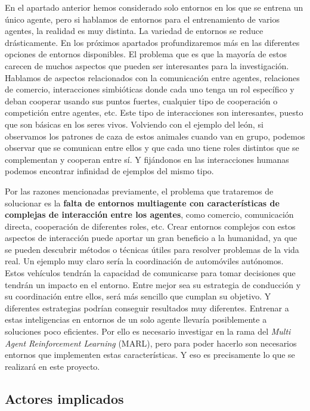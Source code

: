 En el apartado anterior hemos considerado solo entornos en los que se entrena un único agente, pero si hablamos de entornos para el entrenamiento de varios agentes, la realidad es muy distinta. La variedad de entornos se reduce drásticamente. En los próximos apartados profundizaremos más en las diferentes opciones de entornos disponibles. El problema que es que la mayoría de estos carecen de muchos aspectos que pueden ser interesantes para la investigación. Hablamos de aspectos relacionados con la comunicación entre agentes, relaciones de comercio, interacciones simbióticas donde cada uno tenga un rol específico y deban cooperar usando sus puntos fuertes, cualquier tipo de cooperación o competición entre agentes, etc. Este tipo de interacciones son interesantes, puesto que son básicas en los seres vivos. Volviendo con el ejemplo del león, si observamos los patrones de caza de estos animales cuando van en grupo, podemos observar que se comunican entre ellos y que cada uno tiene roles distintos que se complementan y cooperan entre sí. Y fijándonos en las interacciones humanas podemos encontrar infinidad de ejemplos del mismo tipo.

Por las razones mencionadas previamente, el problema que trataremos de solucionar es la \textbf{falta de entornos multiagente con características de complejas de interacción entre los agentes}, como comercio, comunicación directa, cooperación de diferentes roles, etc. Crear entornos complejos con estos aspectos de interacción puede aportar un gran beneficio a la humanidad, ya que se pueden descubrir métodos o técnicas útiles para resolver problemas de la vida real. Un ejemplo muy claro sería la coordinación de automóviles autónomos. Estos vehículos tendrán la capacidad de comunicarse para tomar decisiones que tendrán un impacto en el entorno. Entre mejor sea su estrategia de conducción y su coordinación entre ellos, será más sencillo que cumplan su objetivo. Y diferentes estrategias podrían conseguir resultados muy diferentes. Entrenar a estas inteligencias en entornos de un solo agente llevaría posiblemente a soluciones poco eficientes. Por ello es necesario investigar en la rama del \emph{Multi Agent Reinforcement Learning} (MARL), pero para poder hacerlo son necesarios entornos que implementen estas características. Y eso es precisamente lo que se realizará en este proyecto.

\subsection{Actores implicados}

